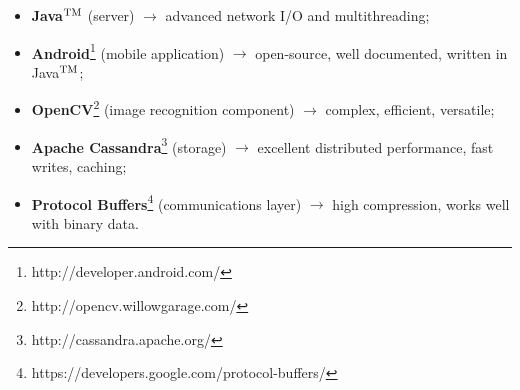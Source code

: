 \documentclass[a4paper,onecolumn,oneside,titlepage,11pt]{report}
\def\tm{\leavevmode\hbox{$\rm {}^{TM}$}}
\begin{document}
\begin{itemize}
\item \textbf{Java\tm} (server) $\rightarrow$ advanced network I/O and multithreading;
\item \textbf{Android}\footnote{http://developer.android.com/} (mobile application) $\rightarrow$ open-source, well documented, written in Java\tm;
\item \textbf{OpenCV}\footnote{http://opencv.willowgarage.com/} (image recognition component) $\rightarrow$ complex, efficient, versatile;
\item \textbf{Apache Cassandra}\footnote{http://cassandra.apache.org/} (storage) $\rightarrow$ excellent distributed performance, fast writes, caching;
\item \textbf{Protocol Buffers}\footnote{https://developers.google.com/protocol-buffers/} (communications layer) $\rightarrow$ high compression, works well with binary data.
\end{itemize}
\end{document}
